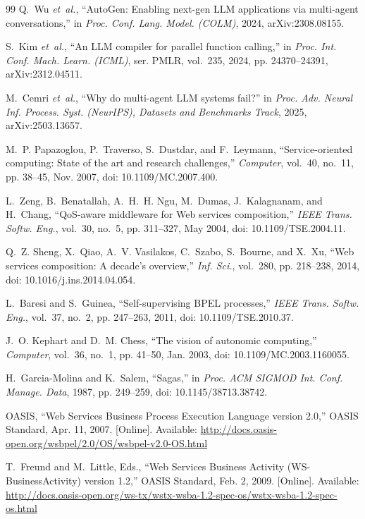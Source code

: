 \documentclass[10pt,journal,compsoc]{IEEEtran}
\begin{document}
\begin{thebibliography}{99}
Q.~Wu \emph{et~al.}, ``AutoGen: Enabling next-gen LLM applications via multi-agent conversations,'' in \emph{Proc. Conf. Lang. Model. (COLM)}, 2024, arXiv:2308.08155.

S.~Kim \emph{et~al.}, ``An LLM compiler for parallel function calling,'' in \emph{Proc. Int. Conf. Mach. Learn. (ICML)}, ser. PMLR, vol.~235, 2024, pp. 24370--24391, arXiv:2312.04511.

M.~Cemri \emph{et~al.}, ``Why do multi-agent LLM systems fail?'' in \emph{Proc. Adv. Neural Inf. Process. Syst. (NeurIPS), Datasets and Benchmarks Track}, 2025, arXiv:2503.13657.

M.~P. Papazoglou, P.~Traverso, S.~Dustdar, and F.~Leymann, ``Service-oriented computing: State of the art and research challenges,'' \emph{Computer}, vol.~40, no.~11, pp. 38--45, Nov. 2007, doi: 10.1109/MC.2007.400.

L.~Zeng, B.~Benatallah, A.~H.~H. Ngu, M.~Dumas, J.~Kalagnanam, and H.~Chang, ``QoS-aware middleware for Web services composition,'' \emph{IEEE Trans. Softw. Eng.}, vol.~30, no.~5, pp. 311--327, May 2004, doi: 10.1109/TSE.2004.11.

Q.~Z. Sheng, X.~Qiao, A.~V. Vasilakos, C.~Szabo, S.~Bourne, and X.~Xu, ``Web services composition: A decade's overview,'' \emph{Inf. Sci.}, vol.~280, pp. 218--238, 2014, doi: 10.1016/j.ins.2014.04.054.

L.~Baresi and S.~Guinea, ``Self-supervising BPEL processes,'' \emph{IEEE Trans. Softw. Eng.}, vol.~37, no.~2, pp. 247--263, 2011, doi: 10.1109/TSE.2010.37.

J.~O. Kephart and D.~M. Chess, ``The vision of autonomic computing,'' \emph{Computer}, vol.~36, no.~1, pp. 41--50, Jan. 2003, doi: 10.1109/MC.2003.1160055.

H.~Garcia-Molina and K.~Salem, ``Sagas,'' in \emph{Proc. ACM SIGMOD Int. Conf. Manage. Data}, 1987, pp. 249--259, doi: 10.1145/38713.38742.

OASIS, ``Web Services Business Process Execution Language version 2.0,'' OASIS Standard, Apr. 11, 2007. [Online]. Available: \url{http://docs.oasis-open.org/wsbpel/2.0/OS/wsbpel-v2.0-OS.html}

T.~Freund and M.~Little, Eds., ``Web Services Business Activity (WS-BusinessActivity) version 1.2,'' OASIS Standard, Feb. 2, 2009. [Online]. Available: \url{http://docs.oasis-open.org/ws-tx/wstx-wsba-1.2-spec-os/wstx-wsba-1.2-spec-os.html}


\end{thebibliography}
\end{document}

